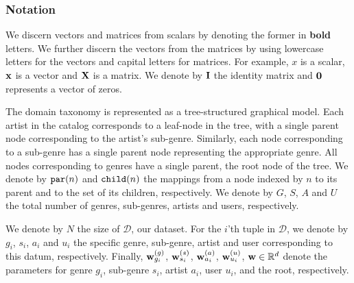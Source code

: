 \subsubsection{Notation}
We discern vectors and matrices from scalars by denoting the former in {\bf bold} letters. We further discern the vectors from the matrices by using lowercase letters for the vectors and capital letters for matrices. For example, $x$ is a scalar, $\mathbf{x}$ is a vector and $\mathbf{X}$ is a matrix. We denote by $\mathbf{I}$ the identity matrix and $\mathbf{0}$ represents a vector of zeros. 


The  domain taxonomy is represented as a tree-structured graphical model. Each artist in the catalog corresponds to a leaf-node in the tree, with a single parent node corresponding to the artist's sub-genre. Similarly, each node corresponding to a sub-genre has a single parent node representing the appropriate genre. All nodes corresponding to genres  have a single parent, the root node of the tree. We denote by $\texttt{par}(n)$ and $\texttt{child}(n)$ the mappings from a node indexed by $n$ to its parent and to the set of its children, respectively. We denote by $G$, $S$, $A$ and $U$ the total number of genres, sub-genres, artists and users, respectively. 

We denote by $N$ the size of $\mathcal{D}$, our dataset.
For the $i$'th tuple in $\mathcal{D}$, we denote by $g_i$, $s_i$, $a_i$ and $u_i$ the specific genre, sub-genre, artist and user corresponding to this datum, respectively.
Finally, $\mathbf{w}^{(g)}_{g_i}$, $\mathbf{w}^{(s)}_{s_i}$, $\mathbf{w}^{(a)}_{a_i}$, $\mathbf{w}^{(u)}_{u_i}$,
$\mathbf{w} \in\mathbb{R}^d$ denote the parameters for genre $g_i$, sub-genre $s_i$, artist $a_i$, user $u_i$, and the root, respectively.

